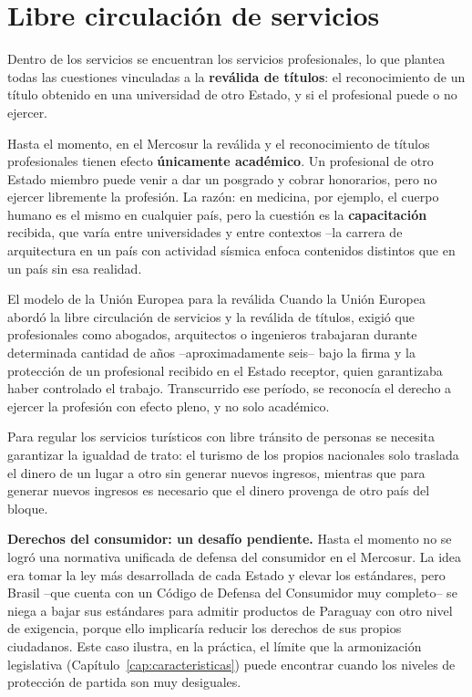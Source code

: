 \documentclass[12pt,oneside]{book}
\begin{document}
\section{Libre circulación de servicios}

Dentro de los servicios se encuentran los servicios profesionales, lo que plantea todas las cuestiones vinculadas a la \textbf{reválida de títulos}: el reconocimiento de un título obtenido en una universidad de otro Estado, y si el profesional puede o no ejercer.

\begin{importante}
Hasta el momento, en el Mercosur la reválida y el reconocimiento de títulos profesionales tienen efecto \textbf{únicamente académico}. Un profesional de otro Estado miembro puede venir a dar un posgrado y cobrar honorarios, pero no ejercer libremente la profesión. La razón: en medicina, por ejemplo, el cuerpo humano es el mismo en cualquier país, pero la cuestión es la \textbf{capacitación} recibida, que varía entre universidades y entre contextos --la carrera de arquitectura en un país con actividad sísmica enfoca contenidos distintos que en un país sin esa realidad.
\end{importante}

\begin{ejemplo}{El modelo de la Unión Europea para la reválida}
Cuando la Unión Europea abordó la libre circulación de servicios y la reválida de títulos, exigió que profesionales como abogados, arquitectos o ingenieros trabajaran durante determinada cantidad de años --aproximadamente seis-- bajo la firma y la protección de un profesional recibido en el Estado receptor, quien garantizaba haber controlado el trabajo. Transcurrido ese período, se reconocía el derecho a ejercer la profesión con efecto pleno, y no solo académico.
\end{ejemplo}

Para regular los servicios turísticos con libre tránsito de personas se necesita garantizar la igualdad de trato: el turismo de los propios nacionales solo traslada el dinero de un lugar a otro sin generar nuevos ingresos, mientras que para generar nuevos ingresos es necesario que el dinero provenga de otro país del bloque.

\begin{nota}
\textbf{Derechos del consumidor: un desafío pendiente.} Hasta el momento no se logró una normativa unificada de defensa del consumidor en el Mercosur. La idea era tomar la ley más desarrollada de cada Estado y elevar los estándares, pero Brasil --que cuenta con un Código de Defensa del Consumidor muy completo-- se niega a bajar sus estándares para admitir productos de Paraguay con otro nivel de exigencia, porque ello implicaría reducir los derechos de sus propios ciudadanos. Este caso ilustra, en la práctica, el límite que la armonización legislativa (Capítulo~\ref{cap:caracteristicas}) puede encontrar cuando los niveles de protección de partida son muy desiguales.
\end{nota}
\end{document}
